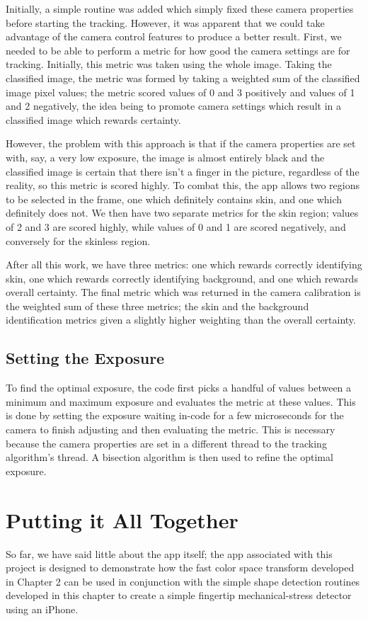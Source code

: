 Initially, a simple routine was added which simply fixed these camera properties before starting the tracking. However, it was apparent that we could take advantage of the camera control features to produce a better result. First, we needed to be able to perform a metric for how good the camera settings are for tracking. Initially, this metric was taken using the whole image. Taking the classified image, the metric was formed by taking a weighted sum of the classified image pixel values; the metric scored values of 0 and 3 positively and values of 1 and 2 negatively, the idea being to promote camera settings which result in a classified image which rewards certainty.

However, the problem with this approach is that if the camera properties are set with, say, a very low exposure, the image is almost entirely black and the classified image is certain that there isn't a finger in the picture, regardless of the reality, so this metric is scored highly. To combat this, the app allows two regions to be selected in the frame, one which definitely contains skin, and one which definitely does not. We then have two separate metrics for the skin region; values of 2 and 3 are scored highly, while values of 0 and 1 are scored negatively, and conversely for the skinless region.

After all this work, we have three metrics: one which rewards correctly identifying skin, one which rewards correctly identifying background, and one which rewards overall certainty. The final metric which was returned in the camera calibration is the weighted sum of these three metrics; the skin and the background identification metrics given a slightly higher weighting than the overall certainty.

\subsection{Setting the Exposure}\label{sec:SettingTheExposure}
To find the optimal exposure, the code first picks a handful of values between a minimum and maximum exposure and evaluates the metric at these values. This is done by setting the exposure waiting in-code for a few microseconds for the camera to finish adjusting and then evaluating the metric. This is necessary because the camera properties are set in a different thread to the tracking algorithm's thread. A bisection algorithm is then used to refine the optimal exposure.


\section{Putting it All Together}\label{sec:PuttingItAllTogether}
So far, we have said little about the app itself; the app associated with this project is designed to demonstrate how the fast color space transform developed in Chapter 2 can be used in conjunction with the simple shape detection routines developed in this chapter to create a simple fingertip mechanical-stress detector using an iPhone.

